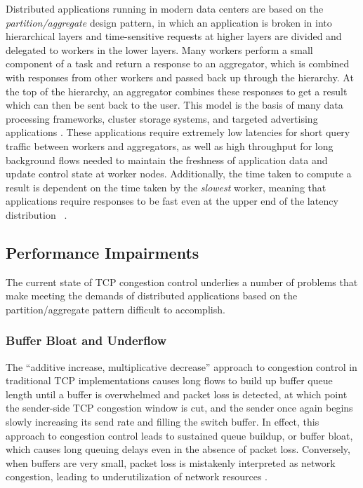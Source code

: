 Distributed applications running in modern data centers are based on the \emph{partition/aggregate} design pattern, in which an application is broken in into hierarchical layers and time-sensitive requests at higher layers are divided and delegated to workers in the lower layers. Many workers perform a small component of a task and return a response to an aggregator, which is combined with responses from other workers and passed back up through the hierarchy. At the top of the hierarchy, an aggregator combines these responses to get a result which can then be sent back to the user. This model is the basis of many data processing frameworks, cluster storage systems, and targeted advertising applications \cite{chen_understanding_2009, dean_mapreduce:_2004, phanishayee_measurement_2008, alizadeh_data_2010}. These applications require extremely low latencies for short query traffic between workers and aggregators, as well as high throughput for long background flows needed to maintain the freshness of application data and update control state at worker nodes. Additionally, the time taken to compute a result is dependent on the time taken by the \emph{slowest} worker, meaning that applications require responses to be fast even at the upper end of the latency distribution ~\cite{alizadeh_data_2010}. 

\subsection{Performance Impairments}

The current state of TCP congestion control underlies a number of problems that make meeting the demands of distributed applications based on the partition/aggregate pattern difficult to accomplish. 

\subsubsection{Buffer Bloat and Underflow}

The ``additive increase, multiplicative decrease'' approach to congestion control in traditional TCP implementations causes long flows to build up buffer queue length until a buffer is overwhelmed and packet loss is detected, at which point the sender-side TCP congestion window is cut, and the sender once again begins slowly increasing its send rate and filling the switch buffer. In effect, this approach to congestion control leads to sustained queue buildup, or buffer bloat, which causes long queuing delays even in the absence of packet loss. Conversely, when buffers are very small, packet loss is mistakenly interpreted as network congestion, leading to underutilization of network resources \cite{cardwell_bbr:_2016}.

